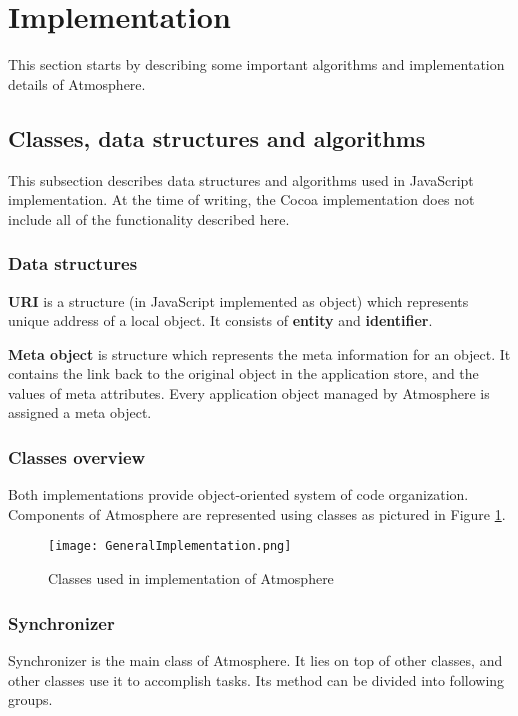 \section{Implementation}

This section starts by describing some important algorithms and implementation details of Atmosphere.

\subsection{Classes, data structures and algorithms}


This subsection describes data structures and algorithms used in JavaScript implementation. At the time of writing, the Cocoa implementation does not include all of the functionality described here.

\subsubsection{Data structures}

\textbf{URI} is a structure (in JavaScript implemented as object) which represents unique address of a local object. It consists of \textbf{entity} and \textbf{identifier}.

\textbf{Meta object} is structure which represents the meta information for an object. It contains the link back to the original object in the application store, and the values of meta attributes. Every application object managed by Atmosphere is assigned a meta object.

\subsubsection{Classes overview}

Both implementations provide object-oriented system of code organization. Components of Atmosphere are represented using classes as pictured in Figure \ref{fig:1}.

\begin{figure}[ht!]
\centering
\texttt{[image: GeneralImplementation.png]}
\caption{Classes used in implementation of Atmosphere \label{fig:1}}
\end{figure}


\subsubsection{Synchronizer}

Synchronizer is the main class of Atmosphere. It lies on top of other classes, and other classes use it to accomplish tasks. Its method can be divided into following groups.

